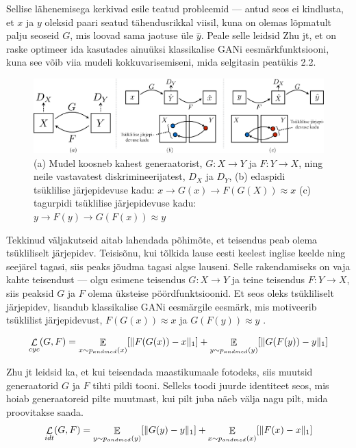 \documentclass{vilgym}
\DeclareMathOperator{\EX}{\mathbb{E}}
\DeclareMathOperator{\loss}{\mathcal{L}}
\DeclarePairedDelimiter{\norm}{\lVert}{\rVert}
\begin{document}
	Sellise lähenemisega kerkivad esile teatud probleemid --- antud seos ei kindlusta, et $ x $ ja $ y $ oleksid paari seatud tähendusrikkal viisil, kuna on olemas lõpmatult palju seoseid $ G $, mis loovad sama jaotuse üle $ \hat{y} $. Peale selle leidsid Zhu jt, et on raske optimeer ida kasutades ainuüksi klassikalise GANi eesmärkfunktsiooni, kuna see võib viia mudeli kokkuvarisemiseni, mida selgitasin peatükis 2.2.

	\begin{figure}[t]
		\centering
			\includegraphics[width=\linewidth]{images/cycle_consistency.png}
			\caption{(a) Mudel koosneb kahest generaatorist, $ G: X \rightarrow Y $ ja $ F: Y \rightarrow X $, ning neile vastavatest diskrimineerijatest, $ D_X $ ja $ D_Y $, (b) edaspidi tsüklilise järjepidevuse kadu: $ x \rightarrow G(x) \rightarrow F(G(X)) \approx x $ (c) tagurpidi tsüklilise järjepidevuse kadu: $ y \rightarrow F(y) \rightarrow G(F(x)) \approx y $ \parencite{cyclegan}}
			\label{fig:cycle_loss}
	\end{figure}

	Tekkinud väljakutseid aitab lahendada põhimõte, et teisendus peab olema tsükliliselt järjepidev. Teisisõnu, kui tõlkida lause eesti keelest inglise keelde ning seejärel tagasi, siis peaks jõudma tagasi algse lauseni. Selle rakendamiseks on vaja kahte teisendust --- olgu esimene teisendus $ G\colon X \rightarrow Y $ ja teine teisendus $ F\colon Y \rightarrow X $, siis peaksid $ G $ ja $ F $ olema üksteise pöördfunktsioonid. Et seos oleks tsükliliselt järjepidev, lisandub klassikalise GANi eesmärgile eesmärk, mis motiveerib tsüklilist järjepidevust, $ F(G(x)) \approx x $ ja $ G(F(y)) \approx y $ .
	
	\begin{equation}
		\loss_{cyc}(G,F) = \EX_{x\sim p_{andmed}(x)}[\norm{F(G(x)) - x}_1] + \EX_{y\sim p_{andmed}(y)}[\norm{G(F(y)) - y}_1]
	\end{equation}

	Zhu jt leidsid ka, et kui teisendada maastikumaale fotodeks, siis muutsid generaatorid $ G $ ja $ F $ tihti pildi tooni. Selleks toodi	juurde identiteet seos, mis hoiab generaatoreid pilte muutmast, kui pilt juba näeb välja nagu pilt, mida proovitakse saada.
	\begin{equation} \label{eq:idt}
		\loss_{idt}(G,F) = \EX_{y\sim p_{andmed}(y)}[\norm{G(y) - y}_1] + \EX_{x\sim p_{andmed}(x)}[\norm{F(x) - x}_1]
	\end{equation}
\end{document}
